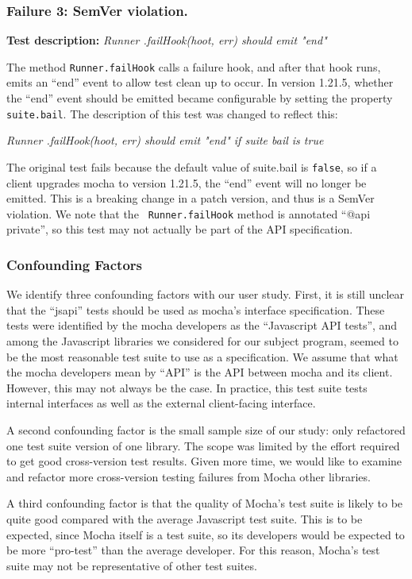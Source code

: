 \subsubsection{Failure 3: SemVer violation.}

{\bf Test description:}
%
{\em Runner .failHook(hoot, err) should emit "end" }

The method {\tt Runner.failHook} calls a failure hook, and after that
hook runs, emits an ``end'' event to allow test clean up to occur. In
version 1.21.5, whether the ``end'' event should be emitted became
configurable by setting the property {\tt suite.bail}.  The
description of this test was changed to reflect this:

{\em Runner .failHook(hoot, err) should emit "end" if suite bail is
  true }

The original test fails because the default value of suite.bail is
{\tt false}, so if a client upgrades mocha to version 1.21.5, the
``end'' event will no longer be emitted. This is a breaking change in
a patch version, and thus is a SemVer violation. We note that the {\tt
  Runner.failHook} method is annotated ``@api private'', so this test
may not actually be part of the API specification.

\subsubsection{Confounding Factors}
We identify three confounding factors with our user study. First, it
is still unclear that the ``jsapi'' tests should be used as mocha's
interface specification. These tests were identified by the mocha
developers as the ``Javascript API tests'', and among the Javascript
libraries we considered for our subject program, seemed to be the most
reasonable test suite to use as a specification. We assume that what
the mocha developers mean by ``API'' is the API between mocha and its
client. However, this may not always be the case. In practice, this
test suite tests internal interfaces as well as the external
client-facing interface.

A second confounding factor is the small sample size of our study:
only refactored one test suite version of one library. The scope was
limited by the effort required to get good cross-version test
results. Given more time, we would like to examine and refactor more
cross-version testing failures from Mocha other libraries.

A third confounding factor is that the quality of Mocha's test suite
is likely to be quite good compared with the average Javascript test
suite. This is to be expected, since Mocha itself is a test suite, so
its developers would be expected to be more ``pro-test'' than the
average developer. For this reason, Mocha's test suite may not be
representative of other test suites.


